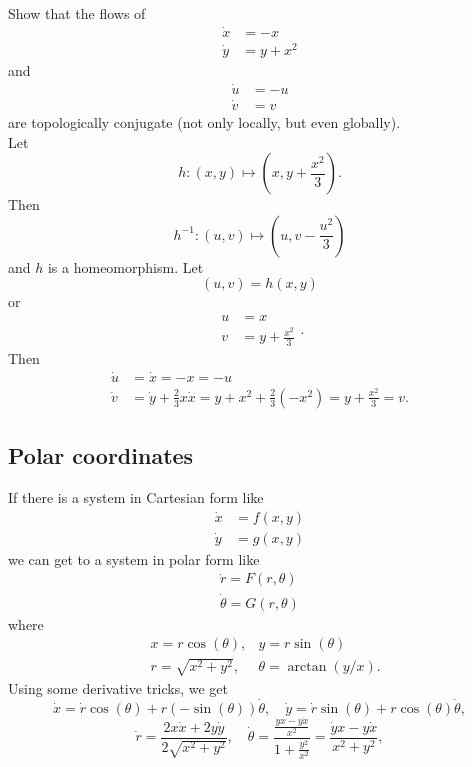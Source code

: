 \documentclass{article}
\begin{document}
\begin{exam}
    Show that the flows of
    $$\begin{aligned}\dot x &= -x\\
    \dot y &= y+x^2\end{aligned}$$
    and
    $$\begin{aligned}\dot u &= -u\\
    \dot v &= v\end{aligned}$$
    are topologically conjugate (not only locally, but even globally).\\
    Let
    $$h:(x,y)\mapsto (x,y+\frac{x^2}{3}).$$
    Then
    $$h^{-1}: (u,v)\mapsto (u,v-\frac{u^2}{3})$$ and $h$ is a homeomorphism. Let
    $$(u,v) = h(x,y)$$
    or
    $$\begin{aligned}u&=x\\
    v&=y+\frac{x^2}{3}\end{aligned}.$$
    Then
    $$\begin{aligned}\dot u &= \dot x=-x = -u\\
    \dot v &= \dot y + \frac{2}{3}x\dot x=y+x^2+\frac{2}{3}(-x^2)= y+\frac{x^2}{3}=v.\end{aligned}$$
\end{exam}

\subsection{Polar coordinates}

If there is a system in Cartesian form like
$$\begin{aligned}\dot x &= f(x,y)\\
\dot y &= g(x,y)\end{aligned}$$
we can get to a system in polar form like
$$\begin{aligned}\dot r = F(r,\theta)\\
\dot \theta = G(r,\theta)\end{aligned}$$
where
$$\begin{aligned}&x = r\cos(\theta), &y = r\sin(\theta)\\
&r = \sqrt{x^2+y^2}, &\theta = \arctan(y/x).\end{aligned}$$
Using some derivative tricks, we get
$$\dot x = \dot r \cos(\theta) +r(-\sin(\theta))\dot \theta, \quad \dot y = \dot r \sin(\theta) + r \cos(\theta) \dot \theta,$$
$$\dot r = \frac{2x\dot x +2y \dot y}{2\sqrt{x^2+y^2}}, \quad \dot \theta = \frac{\frac{\dot yx - y\dot x}{x^2}}{1+\frac{y^2}{x^2}} = \frac{\dot yx-y\dot x}{x^2+y^2},$$
\end{document}
